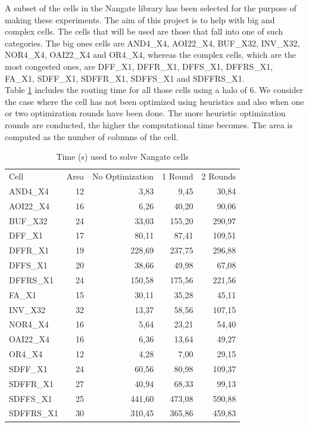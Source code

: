 A subset of the cells in the Nangate library has been selected for the purpose of making these experiments. The aim of this project is to help with big and complex cells. The cells that will be used are those that fall into one of such categories. The big ones cells are AND4\_X4, AOI22\_X4, BUF\_X32, INV\_X32, NOR4\_X4, OAI22\_X4 and OR4\_X4, whereas the complex cells, which are the most congested ones, are DFF\_X1, DFFR\_X1, DFFS\_X1, DFFRS\_X1, FA\_X1, SDFF\_X1, SDFFR\_X1, SDFFS\_X1 and SDFFRS\_X1. \\

Table \ref{tab:base_nangate} includes the routing time for all those cells using a halo of 6. We consider the case where the cell has not been optimized using heuristics and also when one or two optimization rounds have been done. The more heuristic optimization rounds are conducted, the higher the computational time becomes. The area is computed as the number of columns of the cell. \\


\begin{table}
\centering
\begin{tabular}{|l|r|r|r|r|}
\cline{1-5}
Cell & Area & No Optimization & 1 Round & 2 Rounds \\ \cline{1-5}
AND4\_X4 & 12 & 3,83 & 9,45 & 30,84  \\ \hline
AOI22\_X4 & 16 & 6,26 & 40,20 & 90,06  \\ \hline
BUF\_X32 & 24 & 33,03 & 155,20 & 290,97  \\ \hline
DFF\_X1 & 17 & 80,11 & 87,41 & 109,51  \\ \hline
DFFR\_X1 & 19 & 228,69 & 237,75 & 296,88  \\ \hline
DFFS\_X1 & 20 & 38,66 & 49,98 & 67,08  \\ \hline
DFFRS\_X1 & 24 & 150,58 & 175,56 & 221,56  \\ \hline
FA\_X1 & 15 & 30,11 & 35,28 & 45,11  \\ \hline
INV\_X32 & 32 & 13,37 & 58,56 & 107,15  \\ \hline
NOR4\_X4 & 16 & 5,64 & 23,21 & 54,40  \\ \hline
OAI22\_X4 & 16 & 6,36 & 13,64 & 49,27  \\ \hline
OR4\_X4 & 12 & 4,28 & 7,00 & 29,15  \\ \hline
SDFF\_X1 & 24 & 60,56 & 80,98 & 109,37  \\ \hline 
SDFFR\_X1 & 27 & 40,94 & 68,33 & 99,13  \\ \hline 
SDFFS\_X1 & 25 & 441,60 & 473,08 & 590,88  \\ \hline
SDFFRS\_X1 & 30 & 310,45 & 365,86 & 459,83  \\ \hline \cline{1-5}
\end{tabular} 
\caption{Time (s) used to solve Nangate cells}
\label{tab:base_nangate}
\end{table}


